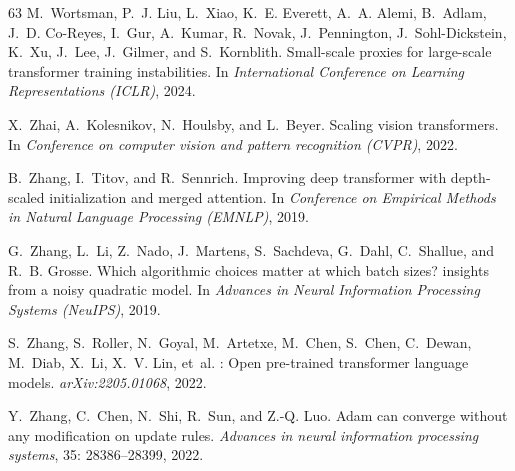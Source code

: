 \documentclass{article}
\theoremstyle{plain}
\theoremstyle{definition}
\theoremstyle{remark}
\begin{document}
\begin{thebibliography}{63}
M.~Wortsman, P.~J. Liu, L.~Xiao, K.~E. Everett, A.~A. Alemi, B.~Adlam, J.~D. Co-Reyes, I.~Gur, A.~Kumar, R.~Novak, J.~Pennington, J.~Sohl-Dickstein, K.~Xu, J.~Lee, J.~Gilmer, and S.~Kornblith.
\newblock Small-scale proxies for large-scale transformer training instabilities.
\newblock In \emph{International Conference on Learning Representations (ICLR)}, 2024.

X.~Zhai, A.~Kolesnikov, N.~Houlsby, and L.~Beyer.
\newblock Scaling vision transformers.
\newblock In \emph{Conference on computer vision and pattern recognition (CVPR)}, 2022.

B.~Zhang, I.~Titov, and R.~Sennrich.
\newblock Improving deep transformer with depth-scaled initialization and merged attention.
\newblock In \emph{Conference on Empirical Methods in Natural Language Processing (EMNLP)}, 2019{}.

G.~Zhang, L.~Li, Z.~Nado, J.~Martens, S.~Sachdeva, G.~Dahl, C.~Shallue, and R.~B. Grosse.
\newblock Which algorithmic choices matter at which batch sizes? insights from a noisy quadratic model.
\newblock In \emph{Advances in Neural Information Processing Systems (NeuIPS)}, 2019{}.

S.~Zhang, S.~Roller, N.~Goyal, M.~Artetxe, M.~Chen, S.~Chen, C.~Dewan, M.~Diab, X.~Li, X.~V. Lin, et~al.
: Open pre-trained transformer language models.
\newblock \emph{arXiv:2205.01068}, 2022{}.

Y.~Zhang, C.~Chen, N.~Shi, R.~Sun, and Z.-Q. Luo.
\newblock Adam can converge without any modification on update rules.
\newblock \emph{Advances in neural information processing systems}, 35: 28386--28399, 2022{}.

\end{thebibliography}


\end{document}
